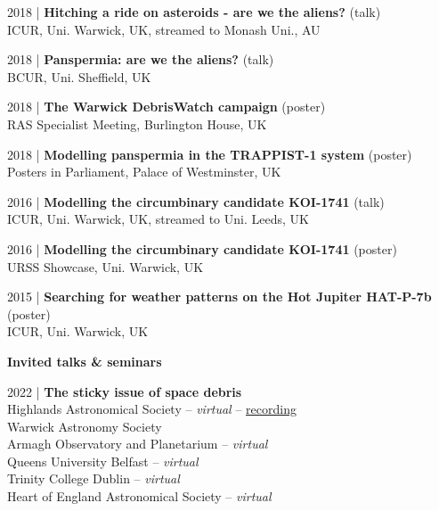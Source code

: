 \documentclass[10pt,a4paper]{altacv}
\begin{document}
\small 2018 | \textbf{Hitching a ride on asteroids - are we the aliens?} (talk) \\
ICUR, Uni. Warwick, UK, streamed to Monash Uni., AU

\smallskip

\small 2018 | \textbf{Panspermia: are we the aliens?} (talk) \\
BCUR, Uni. Sheffield, UK

\smallskip

\small 2018 | \textbf{The Warwick DebrisWatch campaign} (poster) \\
RAS Specialist Meeting, Burlington House, UK

\smallskip

\small 2018 | \textbf{Modelling panspermia in the TRAPPIST-1 system} (poster) \\
Posters in Parliament, Palace of Westminster, UK

\smallskip

\small 2016 | \textbf{Modelling the circumbinary candidate KOI-1741} (talk) \\
ICUR, Uni. Warwick, UK, streamed to Uni. Leeds, UK

\smallskip

\small 2016 | \textbf{Modelling the circumbinary candidate KOI-1741} (poster) \\
URSS Showcase, Uni. Warwick, UK

\smallskip

\small 2015 | \textbf{Searching for weather patterns on the Hot Jupiter HAT-P-7b} (poster) \\
ICUR, Uni. Warwick, UK

\divider

\normalsize \textbf{Invited talks \& seminars}

\medskip

\small 2022 | \textbf{The sticky issue of space debris} \\
Highlands Astronomical Society -- \textit{virtual} -- \href{https://youtu.be/WMC-LWQ0q7o}{recording} \\
Warwick Astronomy Society \\
Armagh Observatory and Planetarium -- \textit{virtual} \\
Queens University Belfast -- \textit{virtual} \\
Trinity College Dublin -- \textit{virtual} \\
Heart of England Astronomical Society -- \textit{virtual}

\smallskip
\end{document}
